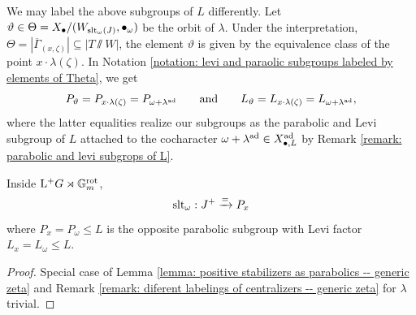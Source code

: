 \begin{remark}\label{remark: diferent labelings of centralizers -- generic zeta}
We may label the above subgroups of $L$ differently. Let $\vartheta \in \Theta = X_{\bullet}/(W_{\operatorname{slt}_{\omega}(J)}, \bullet_{\omega})$ be the orbit of $\lambda$. Under the interpretation, $\Theta = |\overline{\Gamma}_{(x, \zeta)}| \subseteq |T \sslash W|$, the element $\vartheta$ is given by the equivalence class of the point $x \cdot \lambda(\zeta)$. In Notation \ref{notation: levi and paraolic subgroups labeled by elements of Theta}, we get
\begin{equation*}
  P_{\vartheta} = P_{x \cdot \lambda(\zeta)} = P_{\omega+\lambda^{\operatorname{ad}}} 
  \qquad \text{and} \qquad
  L_{\vartheta} = L_{x \cdot \lambda(\zeta)} = L_{\omega+\lambda^{\operatorname{ad}}},
\end{equation*}
where the latter equalities realize our subgroups as the parabolic and Levi subgroup of $L$ attached to the cocharacter $\omega + \lambda^{\operatorname{ad}} \in X^{\operatorname{ad}}_{\bullet, L}$ by Remark \ref{remark: parabolic and levi subgrops of L}.
\end{remark}


\begin{lemma}\label{lemma: positive centralizer as parabolic -- gneric zeta}
Inside $\mathrm{L^+} G \rtimes \mathbb{G}_m^{\mathrm{rot}}$,  
\begin{equation*}
\operatorname{slt}_{\omega}: J^{+} \xrightarrow{=} P_x 
\end{equation*}
where $P_x = P_{\omega} \leq L$ is the opposite parabolic subgroup with Levi factor $L_x = L_{\omega} \leq L$.
\end{lemma}
\begin{proof}
Special case of Lemma \ref{lemma: positive stabilizers as parabolics -- generic zeta} and Remark \ref{remark: diferent labelings of centralizers -- generic zeta} for $\lambda$ trivial.    
\end{proof}



